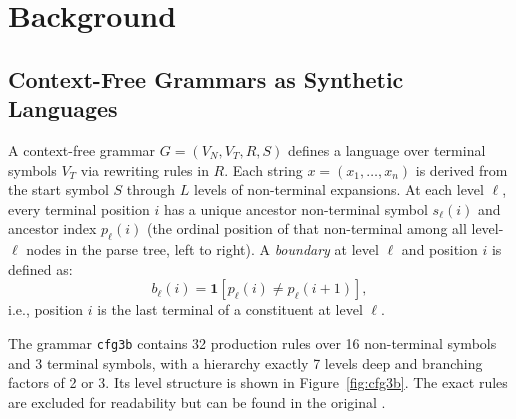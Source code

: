 \documentclass[10pt,twocolumn]{article}
\begin{document}
\section{Background}
\label{sec:background}

\subsection{Context-Free Grammars as Synthetic Languages}

A context-free grammar $G = (V_N, V_T, R, S)$ defines a language over terminal symbols $V_T$ via rewriting rules in $R$. Each string $x = (x_1, \ldots, x_n)$ is derived from the start symbol $S$ through $L$ levels of non-terminal expansions. At each level $\ell$, every terminal position $i$ has a unique ancestor non-terminal symbol $s_\ell(i)$ and ancestor index $p_\ell(i)$ (the ordinal position of that non-terminal among all level-$\ell$ nodes in the parse tree, left to right). A \emph{boundary} at level $\ell$ and position $i$ is defined as:
\[
b_\ell(i) = \mathbf{1}[p_\ell(i) \neq p_\ell(i+1)],
\]
i.e., position $i$ is the last terminal of a constituent at level $\ell$.

The grammar \texttt{cfg3b} contains 32 production rules over 16 non-terminal symbols and 3 terminal symbols, with a hierarchy exactly 7 levels deep and branching factors of 2 or 3. Its level structure is shown in Figure~\ref{fig:cfg3b}. The exact rules are excluded for readability but can be found in the original \citet{allen-zhu2023physics}.
\end{document}
